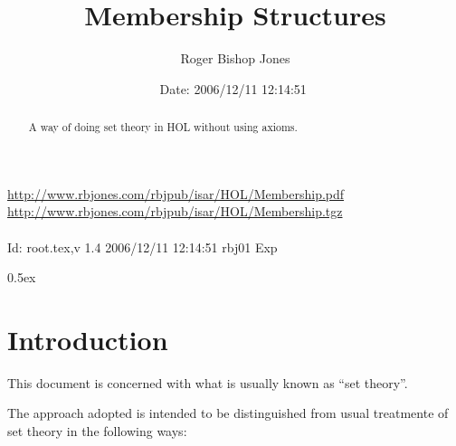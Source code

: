 \documentclass[11pt,a4paper]{article}
\begin{document}
\title{Membership Structures}
\author{Roger Bishop Jones}
\date{$ $Date: 2006/12/11 12:14:51 $ $}
\maketitle

\begin{abstract}
A way of doing set theory in HOL without using axioms.
\end{abstract}

\vfill
\begin{centering}
{\footnotesize
\href{http://www.rbjones.com/rbjpub/isar/HOL/Membership.pdf}{http://www.rbjones.com/rbjpub/isar/HOL/Membership.pdf}\\
\href{http://www.rbjones.com/rbjpub/isar/HOL/Membership.tgz}{http://www.rbjones.com/rbjpub/isar/HOL/Membership.tgz}\\
\ \\
$ $Id: root.tex,v 1.4 2006/12/11 12:14:51 rbj01 Exp $ $\\
}%
\end{centering}

\newpage

\tableofcontents

\parindent 0pt\parskip 0.5ex

\section{Introduction}

This document is concerned with what is usually known as ``set theory''.

The approach adopted is intended to be distinguished from usual treatmente of set theory in the following ways:
\end{document}
